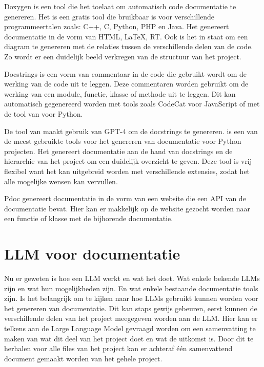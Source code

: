Doxygen \autocite{Doxygen2023} is een tool die het toelaat om automatisch code documentatie te genereren. Het is een gratis tool die bruikbaar is voor verschillende programmeertalen zoals: C++, C, Python, PHP en Java.
Het genereert documentatie in de vorm van HTML, LaTeX, RT. Ook is het in staat om een diagram te genereren met de relaties tussen de verschillende delen van de code.
Zo wordt er een duidelijk beeld verkregen van de structuur van het project.

Docstrings is een vorm van commentaar in de code die gebruikt wordt om de werking van de code uit te leggen.
Deze commentaren worden gebruikt om de werking van een module, functie, klasse of methode uit te leggen.
Dit kan automatisch gegenereerd worden met tools zoals CodeCat \autocite{CodeCat2024} voor JavaScript of met de tool van \textcite{Trofficus2023} voor Python.

De tool van \textcite{Trofficus2023} maakt gebruik van GPT-4 \autocite{OpenAI2023} om de docstrings te genereren.
 is een van de meest gebruikte tools voor het genereren van documentatie voor Python projecten.
Het genereert documentatie aan de hand van docstrings en de hierarchie van het project om een duidelijk overzicht te geven.
Deze tool is vrij flexibel want het kan uitgebreid worden met verschillende extensies, zodat het alle mogelijke wensen kan vervullen.

Pdoc \autocite{GallantHils2023} genereert documentatie in de vorm van een website die een API van de documentatie bevat. 
Hier kan er makkelijk op de website gezocht worden naar een functie of klasse met de bijhorende documentatie.

\section{LLM voor documentatie}
\label{sec:llm-voor-documentatie}

Nu er geweten is hoe een LLM werkt en wat het doet. Wat enkele bekende LLMs zijn en wat hun mogelijkheden zijn. 
En wat enkele bestaande documentatie tools zijn.
Is het belangrijk om te kijken naar hoe LLMs gebruikt kunnen worden voor het genereren van documentatie.
Dit kan staps gewijs gebeuren, eerst kunnen de verschillende delen van het project meegegeven worden aan de LLM. 
Hier kan er telkens aan de Large Language Model gevraagd worden om een samenvatting te maken van wat dit deel van het project doet en wat de uitkomst is.
Door dit te herhalen voor alle files van het project kan er achteraf één samenvattend document gemaakt worden van het gehele project.

